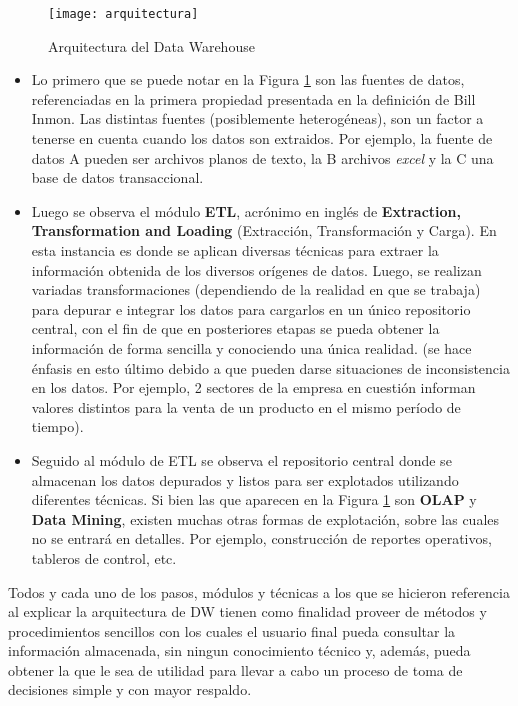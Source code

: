 \documentclass[a4paper,11pt]{article}
\begin{document}
    \begin{figure}
      \begin{center}
        \texttt{[image: arquitectura]}
        \caption{Arquitectura del Data Warehouse}
        \label{dw_arq}
      \end{center}
    \end{figure}
   
    \begin{itemize}
      \item Lo primero que se puede notar en la Figura \ref{dw_arq} son las fuentes de datos, referenciadas en la primera propiedad presentada en la
      definición de Bill Inmon. Las distintas fuentes (posiblemente heterogéneas), son un factor a tenerse en cuenta cuando los
      datos son extraidos. Por ejemplo, la fuente de datos A pueden ser archivos planos de texto, la B archivos \textit{excel} y la C una base de datos 
      transaccional.
    
      \item Luego se observa el módulo \textbf{ETL}, acrónimo en inglés de \textbf{Extraction, Transformation and Loading} (Extracción, Transformación y Carga).
      En esta instancia es donde se aplican diversas técnicas para extraer la información obtenida de
      los diversos orígenes de datos. Luego, se realizan variadas transformaciones (dependiendo de la realidad en que se
      trabaja) para depurar e integrar los datos para cargarlos en un único repositorio central, con el fin de que en posteriores etapas se pueda obtener
      la información de forma sencilla y conociendo una única realidad. (se hace énfasis en esto último debido a que pueden darse situaciones de
      inconsistencia en los datos. Por ejemplo, 2 sectores de la empresa en cuestión informan valores distintos para la venta de un producto en el mismo
      período de tiempo).
    
      \item Seguido al módulo de ETL se observa el repositorio central donde se almacenan los datos depurados y listos para ser explotados utilizando
      diferentes técnicas. Si bien las que aparecen en la Figura \ref{dw_arq} son \textbf{OLAP} y \textbf{Data Mining}, existen muchas otras formas de 
      explotación, sobre las cuales no se entrará en detalles. Por ejemplo, construcción de reportes operativos, tableros de control, etc.
    \end{itemize}

    Todos y cada uno de los pasos, módulos y técnicas a los que se hicieron referencia al explicar la arquitectura de DW tienen como finalidad
    proveer de métodos y procedimientos sencillos con los cuales el usuario final pueda consultar la información almacenada, sin ningun conocimiento técnico y,
    además, pueda obtener la que le sea de utilidad para llevar a cabo un proceso de toma de decisiones simple y con mayor respaldo.
    
\end{document}
